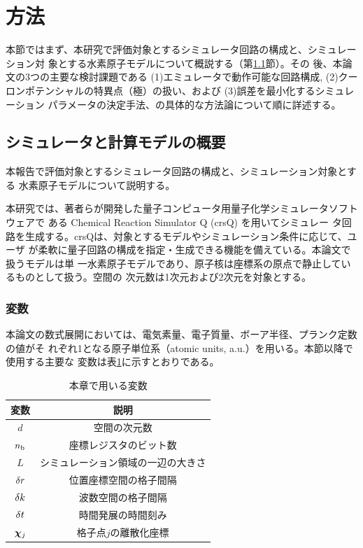 \documentclass[wabun2025.tex]{subfiles}
\begin{document}
\section{方法}
\label{sec:method}
本節ではまず、本研究で評価対象とするシミュレータ回路の構成と、シミュレーション対
象とする水素原子モデルについて概説する（第\ref{subsec:simulator-model}節）。その
後、本論文の3つの主要な検討課題である (1)エミュレータで動作可能な回路構成, (2)クー
ロンポテンシャルの特異点（極）の扱い、および (3)誤差を最小化するシミュレーション
パラメータの決定手法、の具体的な方法論について順に詳述する。

\subsection{シミュレータと計算モデルの概要}
\label{subsec:simulator-model}
本報告で評価対象とするシミュレータ回路の構成と、シミュレーション対象とする
水素原子モデルについて説明する。

本研究では、著者らが開発した量子コンピュータ用量子化学シミュレータソフトウェアで
ある Chemical Reaction Simulator Q (crsQ) \cite{website:crsq} を用いてシミュレー
タ回路を生成する。crsQは、対象とするモデルやシミュレーション条件に応じて、ユーザ
が柔軟に量子回路の構成を指定・生成できる機能を備えている。本論文で扱うモデルは単
一水素原子モデルであり、原子核は座標系の原点で静止しているものとして扱う。空間の
次元数は1次元および2次元を対象とする。

\subsubsection{変数}
本論文の数式展開においては、電気素量、電子質量、ボーア半径、プランク定数の値がそ
れぞれ1となる原子単位系（atomic units, a.u.）を用いる。本節以降で使用する主要な
変数は表\ref{tab:variables}に示すとおりである。

\begin{table}[ht]
    \centering
    \caption{本章で用いる変数}
    \begin{tabular}{cc}
        変数 & 説明 \\
        \hline
        $d$ & 空間の次元数 \\
        $n_{\mathrm{b}}$ & 座標レジスタのビット数 \\
        $L$ & シミュレーション領域の一辺の大きさ \\
        $\delta r$ & 位置座標空間の格子間隔 \\
        $\delta k$ & 波数空間の格子間隔 \\
        $\delta t$ & 時間発展の時間刻み \\
        $\bm{\chi}_{j}$ & 格子点$j$の離散化座標
    \end{tabular}
    \label{tab:variables}
\end{table}
\end{document}

